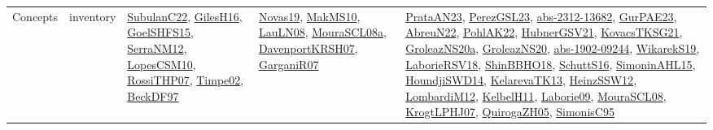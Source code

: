 {\begin{longtable}{lp{3cm}>{\raggedright}p{6cm}>{\raggedright}p{6cm}p{8cm}}
Concepts & inventory & \href{articles/SubulanC22.pdf}{SubulanC22}\cite{SubulanC22}, \href{papers/GilesH16.pdf}{GilesH16}\cite{GilesH16}, \href{articles/GoelSHFS15.pdf}{GoelSHFS15}\cite{GoelSHFS15}, \href{papers/SerraNM12.pdf}{SerraNM12}\cite{SerraNM12}, \href{articles/LopesCSM10.pdf}{LopesCSM10}\cite{LopesCSM10}, \href{papers/RossiTHP07.pdf}{RossiTHP07}\cite{RossiTHP07}, \href{articles/Timpe02.pdf}{Timpe02}\cite{Timpe02}, \href{papers/BeckDF97.pdf}{BeckDF97}\cite{BeckDF97} & \href{articles/Novas19.pdf}{Novas19}\cite{Novas19}, \href{papers/MakMS10.pdf}{MakMS10}\cite{MakMS10}, \href{papers/LauLN08.pdf}{LauLN08}\cite{LauLN08}, \href{papers/MouraSCL08a.pdf}{MouraSCL08a}\cite{MouraSCL08a}, \href{papers/DavenportKRSH07.pdf}{DavenportKRSH07}\cite{DavenportKRSH07}, \href{papers/GarganiR07.pdf}{GarganiR07}\cite{GarganiR07} & \href{articles/PrataAN23.pdf}{PrataAN23}\cite{PrataAN23}, \href{papers/PerezGSL23.pdf}{PerezGSL23}\cite{PerezGSL23}, \href{articles/abs-2312-13682.pdf}{abs-2312-13682}\cite{abs-2312-13682}, \href{articles/GurPAE23.pdf}{GurPAE23}\cite{GurPAE23}, \href{articles/AbreuN22.pdf}{AbreuN22}\cite{AbreuN22}, \href{articles/PohlAK22.pdf}{PohlAK22}\cite{PohlAK22}, \href{articles/HubnerGSV21.pdf}{HubnerGSV21}\cite{HubnerGSV21}, \href{papers/KovacsTKSG21.pdf}{KovacsTKSG21}\cite{KovacsTKSG21}, \href{papers/GroleazNS20a.pdf}{GroleazNS20a}\cite{GroleazNS20a}, \href{papers/GroleazNS20.pdf}{GroleazNS20}\cite{GroleazNS20}, \href{articles/abs-1902-09244.pdf}{abs-1902-09244}\cite{abs-1902-09244}, \href{articles/WikarekS19.pdf}{WikarekS19}\cite{WikarekS19}, \href{articles/LaborieRSV18.pdf}{LaborieRSV18}\cite{LaborieRSV18}, \href{articles/ShinBBHO18.pdf}{ShinBBHO18}\cite{ShinBBHO18}, \href{papers/SchuttS16.pdf}{SchuttS16}\cite{SchuttS16}, \href{articles/SimoninAHL15.pdf}{SimoninAHL15}\cite{SimoninAHL15}, \href{papers/HoundjiSWD14.pdf}{HoundjiSWD14}\cite{HoundjiSWD14}, \href{papers/KelarevaTK13.pdf}{KelarevaTK13}\cite{KelarevaTK13}, \href{articles/HeinzSSW12.pdf}{HeinzSSW12}\cite{HeinzSSW12}, \href{articles/LombardiM12.pdf}{LombardiM12}\cite{LombardiM12}, \href{articles/KelbelH11.pdf}{KelbelH11}\cite{KelbelH11}, \href{papers/Laborie09.pdf}{Laborie09}\cite{Laborie09}, \href{papers/MouraSCL08.pdf}{MouraSCL08}\cite{MouraSCL08}, \href{papers/KrogtLPHJ07.pdf}{KrogtLPHJ07}\cite{KrogtLPHJ07}, \href{papers/QuirogaZH05.pdf}{QuirogaZH05}\cite{QuirogaZH05}, \href{papers/SimonisC95.pdf}{SimonisC95}\cite{SimonisC95}\\

\end{longtable}}
